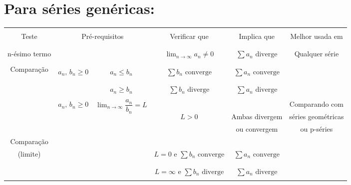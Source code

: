 \documentclass[12pt]{article}
\begin{document}
\setcounter{secnumdepth}{0}

\section{Para séries genéricas:}

\begin{table}[h!]
	\centering
	\begin{tabular}{|c|c|c|c|c|c|}
		\hline
		&\multicolumn{2}{c|}{}&&&\\
		Teste & \multicolumn{2}{c|}{Pré-requisitos} & Verificar que & Implica que & Melhor usada em \\
		&\multicolumn{2}{c|}{}&&&\\
		\hline
		&\multicolumn{2}{c|}{}&&&\\
		n-ésimo termo &
		\multicolumn{2}{c|}{} &
		$\displaystyle \lim_{n \rightarrow \infty} a_n \neq 0$ &
		$\displaystyle \sum a_n \text{ diverge}$ &
		Qualquer série \\
		&\multicolumn{2}{c|}{}&&&\\
		\hline
		\multirow{7}{*}{Comparação} &&&&& \\
		&
		\multirow{5}{*}{$a_n,\, b_n \geq 0$} &
		$a_n \leq b_n$ &
		$\displaystyle \sum b_n \text{ converge}$ &
		$\displaystyle \sum a_n \text{ converge}$ & \\
		&&&&&\\
		\cline{3-5}
		&&&&&\\
		&&
		$a_n \geq b_n$ &
		$\displaystyle \sum b_n \text{ diverge}$ &
		$\displaystyle \sum a_n \text{ diverge}$ & \\
		&&&&&\\
		\cline{1-5}
		& \multirow{9}{*}{$a_n,\, b_n \geq 0$} & \multirow{9}{*}{$\displaystyle \lim_{n \rightarrow \infty} \dfrac{a_n}{b_n} = L$} &&& Comparando com \\
		&&& $L > 0$ & Ambas divergem & séries geométricas \\
		&&&& ou convergem & ou p-séries\\
		\cline{4-5}
		Comparação &&&&&\\
		(limite) &&& $L = 0 \text{ e } \displaystyle \sum b_n \text{ converge} $ & $\displaystyle \sum a_n \text{ converge}$ &\\
		&&&&&\\
		\cline{4-5}
		&&&&&\\
		&&& $L = \infty \text{ e } \displaystyle \sum b_n \text{ diverge}$ & $\displaystyle \sum a_n \text{ diverge}$ &\\
		&&&&&\\

\end{tabular}
\end{table}
\end{document}
